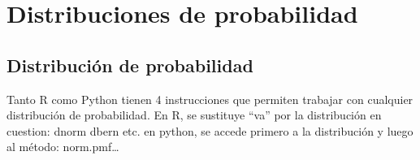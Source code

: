 \documentclass[
]{article}
\begin{document}
\hypertarget{distribuciones-de-probabilidad}{%
\section{Distribuciones de
probabilidad}\label{distribuciones-de-probabilidad}}

\hypertarget{distribuciuxf3n-de-probabilidad}{%
\subsection{Distribución de
probabilidad}\label{distribuciuxf3n-de-probabilidad}}

Tanto R como Python tienen 4 instrucciones que permiten trabajar con
cualquier distribución de probabilidad. En R, se sustituye ``va'' por la
distribución en cuestion: dnorm dbern etc. en python, se accede primero
a la distribución y luego al método: norm.pmf\ldots{}
\end{document}
